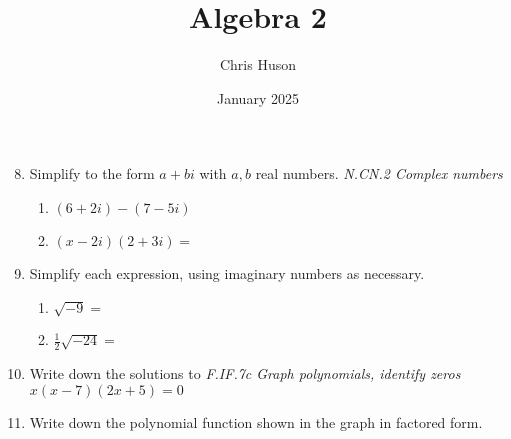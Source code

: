 \documentclass[12pt, twoside]{article}
\title{Algebra 2}
\author{Chris Huson}
\date{January 2025}
\begin{document}
\begin{enumerate}
    \setcounter{enumi}{7}

\item Simplify to the form $a+bi$ with $a,b$ real numbers. \hfill \emph{N.CN.2 Complex numbers}
    \begin{multicols}{2}
        \begin{enumerate}[itemsep=1.5cm]
            \item $(6 + 2i) - (7 - 5i)$
            \item $(x - 2i)(2 + 3i)=$
        \end{enumerate}
    \end{multicols}  \vspace{3cm}

\item Simplify each expression, using imaginary numbers as necessary.
    \begin{multicols}{2}
    \begin{enumerate}[itemsep=0.5cm]
        \item $\sqrt{-9}=$
        \item $\displaystyle \frac{1}{2} \sqrt{-24}=$
    \end{enumerate}
    \end{multicols} \vspace{1cm}


\item Write down the solutions to \hfill \emph{F.IF.7c Graph polynomials, identify zeros} \\
$x(x -7)(2x + 5) = 0$
\vspace{2cm}

\item Write down the polynomial function shown in the graph in factored form. 
\begin{flushright}
    \end{flushright}

       
\end{enumerate}
\end{document}
